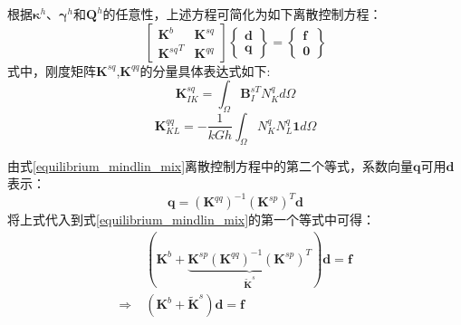 根据$\boldsymbol\kappa^h$、$\boldsymbol\gamma^h$和$\boldsymbol Q^h$的任意性，上述方程可简化为如下离散控制方程：
\begin{equation} \label{equilibrium_mindlin_mix}
    \begin{bmatrix}\boldsymbol{K}^{b}&\boldsymbol{K}^{sq}\\{\boldsymbol{K}^{sq}}^T&\boldsymbol{K}^{qq}\end{bmatrix}
    \begin{Bmatrix}\boldsymbol{d}\\\boldsymbol{q}\end{Bmatrix}=
    \begin{Bmatrix}\boldsymbol{f}\\\boldsymbol{0}\end{Bmatrix}
\end{equation}
式中，刚度矩阵$\boldsymbol K^{sq}$,$\boldsymbol K^{qq}$的分量具体表达式如下:
\begin{equation} 
    \boldsymbol K^{sq}_{IK} = \int_\Omega \boldsymbol B^{sT}_I N^q_K d\Omega
\end{equation} 
\begin{equation} 
    \boldsymbol K^{qq}_{KL} = -\frac{1}{kGh} \int_\Omega N^q_K N^q_L \boldsymbol 1 d\Omega
\end{equation}

由式\eqref{equilibrium_mindlin_mix}离散控制方程中的第二个等式，系数向量$\boldsymbol q$可用$\boldsymbol d$表示：
\begin{equation}
    \boldsymbol q =(\boldsymbol K^{qq})^{-1} (\boldsymbol K^{sp})^T \boldsymbol d
\end{equation}
将上式代入到式\eqref{equilibrium_mindlin_mix}的第一个等式中可得：
\begin{equation}\label{equilibrium_mindlin_projection}
    \begin{split}
        &(\boldsymbol K^{b} + \underbrace{\boldsymbol K^{sp}(\boldsymbol K^{qq})^{-1}(\boldsymbol K^{sp})^{T}}_{\tilde{\boldsymbol K}^s}) \boldsymbol d = \boldsymbol f \\
        \Rightarrow\;& (\boldsymbol K^b + \tilde{\boldsymbol K}^s)\boldsymbol d = \boldsymbol f
    \end{split}
\end{equation}
